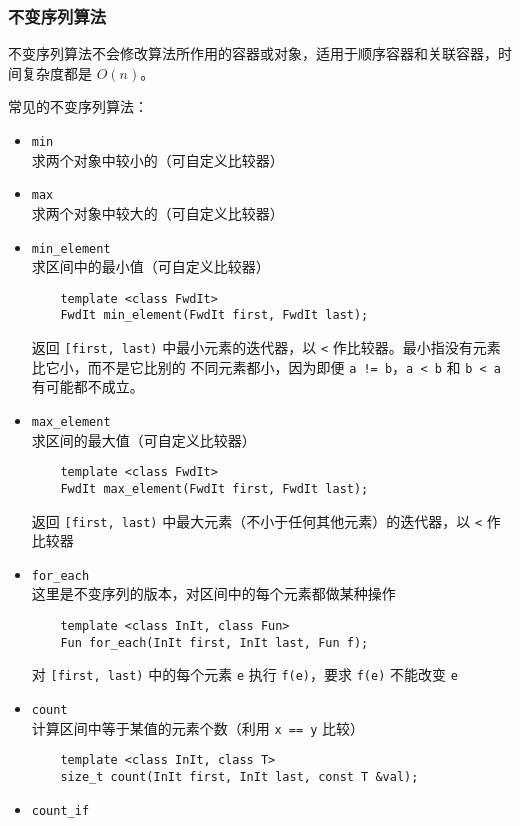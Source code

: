 \documentclass[UTF8]{ctexart}
\begin{document}
\subsubsection{不变序列算法}
不变序列算法不会修改算法所作用的容器或对象，适用于顺序容器和关联容器，时间复杂度都是 $O(n)$。

常见的不变序列算法：
\begin{itemize}
    \item \texttt{min} \\
    求两个对象中较小的（可自定义比较器）
    \item \texttt{max} \\
    求两个对象中较大的（可自定义比较器）
    \item \texttt{min\_element} \\
    求区间中的最小值（可自定义比较器）
    \begin{verbatim}
    template <class FwdIt>
    FwdIt min_element(FwdIt first, FwdIt last);
    \end{verbatim}
    返回 \texttt{[first, last)} 中最小元素的迭代器，以 \texttt{<} 作比较器。最小指没有元素比它小，而不是它比别的
    不同元素都小，因为即便 \texttt{a != b}，\texttt{a < b} 和 \texttt{b < a} 有可能都不成立。
    \item \texttt{max\_element} \\
    求区间的最大值（可自定义比较器）
    \begin{verbatim}
    template <class FwdIt>
    FwdIt max_element(FwdIt first, FwdIt last);
    \end{verbatim}
    返回 \texttt{[first, last)} 中最大元素（不小于任何其他元素）的迭代器，以 \texttt{<} 作比较器
    \item \texttt{for\_each} \\
    这里是不变序列的版本，对区间中的每个元素都做某种操作
    \begin{verbatim}
    template <class InIt, class Fun>
    Fun for_each(InIt first, InIt last, Fun f);
    \end{verbatim}
    对 \texttt{[first, last)} 中的每个元素 \texttt{e} 执行 \texttt{f(e)}，要求 \texttt{f(e)} 不能改变
    \texttt{e}
    \item \texttt{count} \\
    计算区间中等于某值的元素个数（利用 \texttt{x == y} 比较）
    \begin{verbatim}
    template <class InIt, class T>
    size_t count(InIt first, InIt last, const T &val);
    \end{verbatim}
    \item \texttt{count\_if} \\

\end{itemize}
\end{document}

